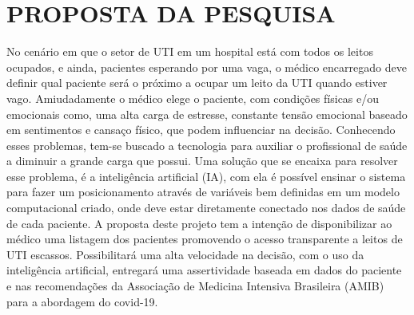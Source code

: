 \documentclass[12pt]{article}
\begin{document}

\section{PROPOSTA DA PESQUISA}
No cenário em que o setor de UTI em um hospital está com todos os leitos ocupados, e ainda, pacientes esperando por uma vaga, o médico encarregado deve definir qual paciente será o próximo a ocupar um leito da UTI quando estiver vago. Amiudadamente o médico elege o paciente, com condições físicas e/ou emocionais como, uma alta carga de estresse, constante tensão emocional baseado em sentimentos e cansaço físico, que podem influenciar na decisão.
Conhecendo esses problemas, tem-se buscado a tecnologia para auxiliar o profissional de saúde a diminuir a grande carga que possui. Uma solução que se encaixa para resolver esse problema, é a inteligência artificial (IA), com ela é possível ensinar o sistema para fazer um posicionamento através de variáveis bem definidas em um modelo computacional criado, onde deve estar diretamente conectado nos dados de saúde de cada paciente.
A proposta deste projeto tem a intenção de disponibilizar ao médico uma listagem dos pacientes promovendo o acesso transparente a leitos de UTI escassos. Possibilitará uma alta velocidade na decisão, com o uso da inteligência artificial, entregará uma assertividade baseada em dados do paciente e nas recomendações da Associação de Medicina Intensiva Brasileira (AMIB) para a abordagem do covid-19.
\end{document}
